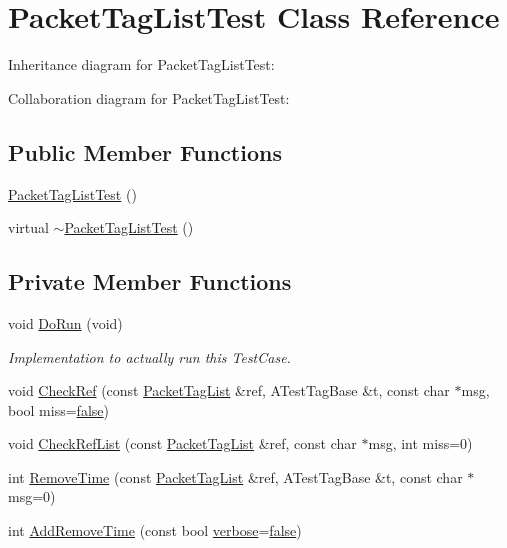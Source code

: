 \hypertarget{classPacketTagListTest}{}\section{Packet\+Tag\+List\+Test Class Reference}
\label{classPacketTagListTest}


Inheritance diagram for Packet\+Tag\+List\+Test\+:


Collaboration diagram for Packet\+Tag\+List\+Test\+:
\subsection*{Public Member Functions}
\begin{DoxyCompactItemize}
\item 
\hyperlink{classPacketTagListTest_a792c212f7e3fb34b9894a265b6093c95}{Packet\+Tag\+List\+Test} ()
\item 
virtual \hyperlink{classPacketTagListTest_a8aedc23b93eb151f65b8c355ba538bac}{$\sim$\+Packet\+Tag\+List\+Test} ()
\end{DoxyCompactItemize}
\subsection*{Private Member Functions}
\begin{DoxyCompactItemize}
\item 
void \hyperlink{classPacketTagListTest_ad69a038e0427451c4aca7ebb7eed35ef}{Do\+Run} (void)
\begin{DoxyCompactList}\small\item\em Implementation to actually run this Test\+Case. \end{DoxyCompactList}\item 
void \hyperlink{classPacketTagListTest_aa19886f5e7e1c50a13088a315c12807b}{Check\+Ref} (const \hyperlink{classns3_1_1PacketTagList}{Packet\+Tag\+List} \&ref, A\+Test\+Tag\+Base \&t, const char $\ast$msg, bool miss=\hyperlink{lte__cqi__generation_8m_ab1bef239d413c4da139c4bac92cd657a}{false})
\item 
void \hyperlink{classPacketTagListTest_a3cbb0392f10206f2eb9e593bd6341f72}{Check\+Ref\+List} (const \hyperlink{classns3_1_1PacketTagList}{Packet\+Tag\+List} \&ref, const char $\ast$msg, int miss=0)
\item 
int \hyperlink{classPacketTagListTest_aeec7c5d85e7d0d330849a18a91ca60a1}{Remove\+Time} (const \hyperlink{classns3_1_1PacketTagList}{Packet\+Tag\+List} \&ref, A\+Test\+Tag\+Base \&t, const char $\ast$msg=0)
\item 
int \hyperlink{classPacketTagListTest_a5998d580bdd4f85ed0a073f0a54b7b3f}{Add\+Remove\+Time} (const bool \hyperlink{openflow-switch_8cc_ab3f078684998b83967d507d0f453f454}{verbose}=\hyperlink{lte__cqi__generation_8m_ab1bef239d413c4da139c4bac92cd657a}{false})
\end{DoxyCompactItemize}
